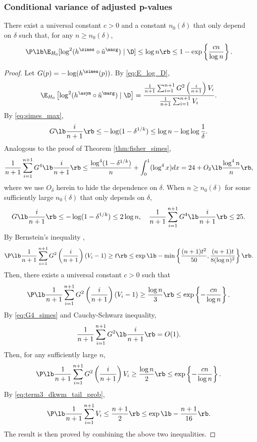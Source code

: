 \subsubsection{Conditional variance of adjusted p-values}
\begin{lemma}\label{lem:cond_var_simes}
  There exist a universal constant $c > 0$ and a constant $n_0(\delta)$ that only depend on $\delta$ such that, for any $n\ge n_0(\delta)$,
  \begin{equation*}
    \P\lb\E_{H_0}[\log^2 (h^\simes \circ \hat{u}^\marg)\mid \D]\le \log n\rb \le 1 - \exp\left\{ \frac{cn}{\log n}\right\}.
  \end{equation*}
\end{lemma}
\begin{proof}
  Let $G(p) = -\log (h^\simes(p))$. By \eqref{eq:E_log_D},
  \[\E_{H_0}\left[\log^2 (h^\asym \circ \hat{u}^\marg)\mid \D\right] = \frac{\frac{1}{n+1}\sum_{i=1}^{n+1}G^2\left(\frac{i}{n+1}\right)V_{i}}{\frac{1}{n+1}\sum_{i=1}^{n+1}V_{i}}.\]
  By \eqref{eq:simes_max},
  \begin{equation*}
    G\lb\frac{i}{n+1}\rb\le -\log(1 - \delta^{1/k})\le \log n -  \log\log\frac{1}{\delta}.
  \end{equation*}
  Analogous to the proof of Theorem \ref{thm:fisher_simes},
  \begin{equation}
    \label{eq:G4_simes}
    \frac{1}{n+1}\sum_{i=1}^{n+1}G^4\lb\frac{i}{n+1}\rb\le \frac{\log^4(1 - \delta^{1/k})}{n} + \int_{0}^{1}(\log^4 x)dx = 24 + O_{\delta}\lb\frac{\log^4 n}{n}\rb,
  \end{equation}
  where we use $O_{\delta}$ herein to hide the dependence on $\delta$. When $n\ge n_0(\delta)$ for some sufficiently large $n_0(\delta)$ that only depends on $\delta$,
  \begin{equation}
    \label{eq:simes_max_element}
    G\lb\frac{i}{n+1}\rb\le -\log(1 - \delta^{1/k})\le 2\log n, \quad \frac{1}{n+1}\sum_{i=1}^{n+1}G^4\lb\frac{i}{n+1}\rb\le 25.
  \end{equation}
  By Bernstein's inequality \citep[e.g.,][Proposition 2.9]{wainwright2019high},
  \[\P\lb \frac{1}{n+1}\sum_{i=1}^{n+1}G^2\left(\frac{i}{n+1}\right)(V_{i} - 1)\ge t\rb\le \exp\lb-\min\left\{\frac{(n+1)t^2}{50}, \frac{(n+1)t}{8(\log n)^2}\right\}\rb.\]
  Then, there exists a universal constant $c > 0$ such that
  \[\P\lb \frac{1}{n+1}\sum_{i=1}^{n+1}G^2\left(\frac{i}{n+1}\right)(V_{i} - 1)\ge \frac{\log n}{3}\rb\le \exp\left\{-\frac{cn}{\log n}\right\}.\]
  By \eqref{eq:G4_simes} and Cauchy-Schwarz inequality,
  \[\frac{1}{n+1}\sum_{i=1}^{n+1}G^2\lb\frac{i}{n+1}\rb = O(1).\]
  Then, for any sufficiently large $n$,
  \[\P\lb \frac{1}{n+1}\sum_{i=1}^{n+1}G^2\left(\frac{i}{n+1}\right)V_{i}\ge \frac{\log n}{2}\rb\le \exp\left\{-\frac{cn}{\log n}\right\}.\]
  By \eqref{eq:term3_dkwm_tail_prob},
  \[\P\lb \frac{1}{n+1}\sum_{i=1}^{n+1}V_i \le \frac{n+1}{2}\rb\le \exp\lb-\frac{n+1}{16}\rb.\]
  The result is then proved by combining the above two inequalities.
\end{proof}


